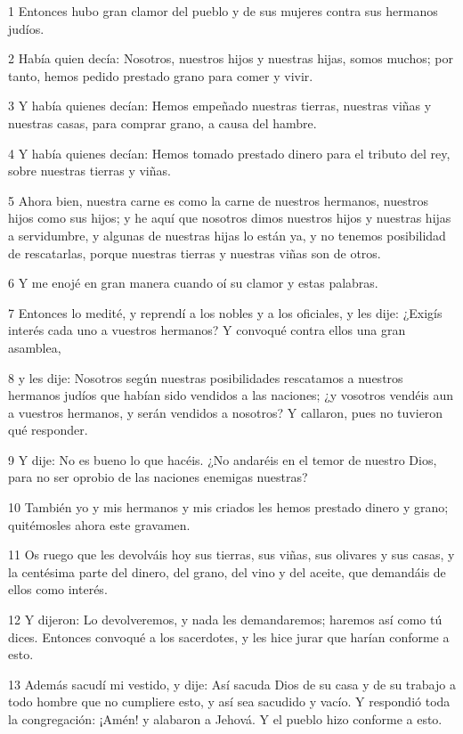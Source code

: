 \par 1 Entonces hubo gran clamor del pueblo y de sus mujeres contra sus hermanos judíos. 
\par 2 Había quien decía: Nosotros, nuestros hijos y nuestras hijas, somos muchos; por tanto, hemos pedido prestado grano para comer y vivir.
\par 3 Y había quienes decían: Hemos empeñado nuestras tierras, nuestras viñas y nuestras casas, para comprar grano, a causa del hambre.
\par 4 Y había quienes decían: Hemos tomado prestado dinero para el tributo del rey, sobre nuestras tierras y viñas.
\par 5 Ahora bien, nuestra carne es como la carne de nuestros hermanos, nuestros hijos como sus hijos; y he aquí que nosotros dimos nuestros hijos y nuestras hijas a servidumbre, y algunas de nuestras hijas lo están ya, y no tenemos posibilidad de rescatarlas, porque nuestras tierras y nuestras viñas son de otros.
\par 6 Y me enojé en gran manera cuando oí su clamor y estas palabras.
\par 7 Entonces lo medité, y reprendí a los nobles y a los oficiales, y les dije: ¿Exigís interés cada uno a vuestros hermanos? Y convoqué contra ellos una gran asamblea,
\par 8 y les dije: Nosotros según nuestras posibilidades rescatamos a nuestros hermanos judíos que habían sido vendidos a las naciones; ¿y vosotros vendéis aun a vuestros hermanos, y serán vendidos a nosotros? Y callaron, pues no tuvieron qué responder.
\par 9 Y dije: No es bueno lo que hacéis. ¿No andaréis en el temor de nuestro Dios, para no ser oprobio de las naciones enemigas nuestras?
\par 10 También yo y mis hermanos y mis criados les hemos prestado dinero y grano; quitémosles ahora este gravamen.
\par 11 Os ruego que les devolváis hoy sus tierras, sus viñas, sus olivares y sus casas, y la centésima parte del dinero, del grano, del vino y del aceite, que demandáis de ellos como interés.
\par 12 Y dijeron: Lo devolveremos, y nada les demandaremos; haremos así como tú dices. Entonces convoqué a los sacerdotes, y les hice jurar que harían conforme a esto.
\par 13 Además sacudí mi vestido, y dije: Así sacuda Dios de su casa y de su trabajo a todo hombre que no cumpliere esto, y así sea sacudido y vacío. Y respondió toda la congregación: ¡Amén! y alabaron a Jehová. Y el pueblo hizo conforme a esto.
